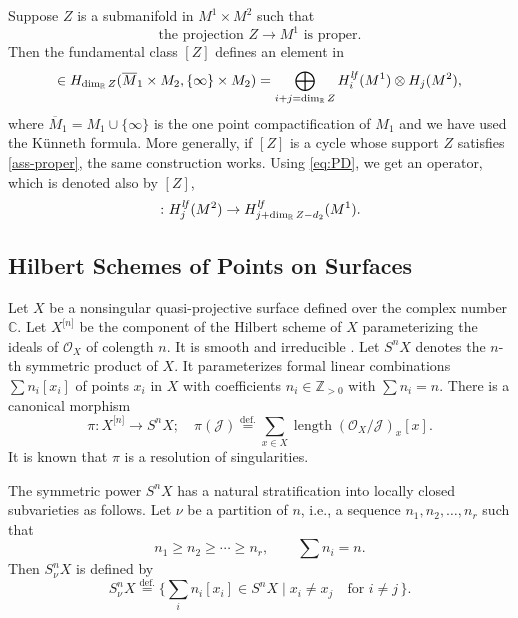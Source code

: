 \documentclass[12pt]{amsart}
\newcommand{\cal}{\mathcal}
\theoremstyle{definition}
\theoremstyle{remark}
\numberwithin{equation}{section}
\newcommand{\defeq}{\overset{\operatorname{\scriptstyle def.}}{=}}
\newcommand{\C}{{\mathbb C}}
\newcommand{\R}{{\mathbb R}}
\newcommand{\Hilb}[2]{{#1}^{\lbrack{#2}\rbrack}} %
\newcommand{\Hilbn}[1]{\Hilb{#1}{n}}
\newcommand{\shfO}{\cal O} %
\newcommand{\Hlf}{H^{\it lf}} %
\begin{document}
Suppose $Z$ is a submanifold in $M^1\times M^2$ such that
\begin{equation}
  \text{the projection $Z \to M^1$ is proper.}
  \label{ass-proper}
\end{equation}
Then the fundamental class $[Z]$ defines an element in
\begin{equation*}
  [Z] \in
  H_{\dim_\R Z}(\overline M_1\times M_2, \{\infty\}\times M_2)
  = \bigoplus_{i + j = \dim_\R Z} \Hlf_i(M^1)\otimes H_j(M^2),
\end{equation*}
where $\overline M_1 = M_1\cup\{\infty\}$ is the one point
compactification of $M_1$ and we have used the K\"unneth formula.
More generally, if $[Z]$ is a cycle whose support $Z$ satisfies
\eqref{ass-proper}, the same construction works.
Using \eqref{eq:PD}, we get an operator, which is denoted also by $[Z]$,
\begin{equation*}
  [Z]\colon \Hlf_j(M^2)\to \Hlf_{j + \dim_\R Z - d_2}(M^1).
\end{equation*}
%
\subsection{Hilbert Schemes of Points on Surfaces}
\label{subsec:Hilb}
%
Let $X$ be a nonsingular quasi-projective surface defined
over the complex number $\C$. Let $\Hilbn{X}$ be the component of the
Hilbert scheme of $X$ parameterizing the ideals of $\shfO_X$ of
colength $n$. It is smooth and irreducible \cite{Fogarty}.
Let $S^n X$ denotes the $n$-th symmetric product of $X$.
It parameterizes formal linear combinations $\sum n_i [x_i]$ of points
$x_i$ in $X$ with coefficients $n_i\in\mathbb Z_{> 0}$ with $\sum n_i = n$.
There is a canonical morphism
\begin{equation*}
  \pi\colon \Hilbn{X}\to S^n X; \quad
  \pi(\cal J) \defeq \sum_{x\in X}
           \operatorname{length}(\shfO_X/\cal J)_x [x].
\end{equation*}
It is known that $\pi$ is a resolution of singularities.

The symmetric power $S^n X$ has a natural stratification into locally
closed subvarieties as follows. Let $\nu$ be a partition of $n$, i.e.,
a sequence $n_1, n_2, \dots, n_r$ such that
\begin{equation*}
  n_1 \ge n_2 \ge \cdots \ge n_r, \qquad \sum n_i = n.
\end{equation*}
Then $S^n_\nu X$ is defined by
\begin{equation*}
  S^n_\nu X \defeq \{ \sum_i n_i [x_i] \in S^n X\mid
     x_i \ne x_j \quad\text{for $i\ne j$}\, \}.
\end{equation*}
\end{document}
